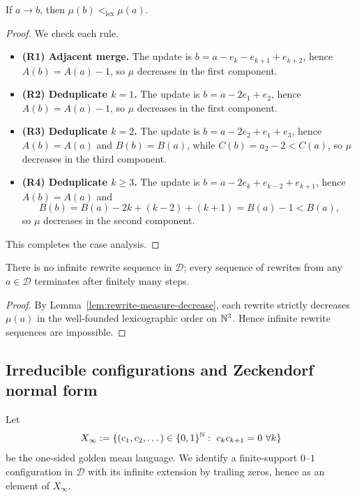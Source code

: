 \begin{lemma}\label{lem:rewrite-measure-decrease}
If $a\to b$, then $\mu(b)<_{\mathrm{lex}}\mu(a)$.
\end{lemma}
\begin{proof}
We check each rule.
\begin{itemize}
  \item \textbf{(R1) Adjacent merge.}
  The update is $b=a-e_k-e_{k+1}+e_{k+2}$, hence $A(b)=A(a)-1$, so $\mu$ decreases in the first component.
  \item \textbf{(R2) Deduplicate $k=1$.}
  The update is $b=a-2e_1+e_2$, hence $A(b)=A(a)-1$, so $\mu$ decreases in the first component.
  \item \textbf{(R3) Deduplicate $k=2$.}
  The update is $b=a-2e_2+e_1+e_3$, hence $A(b)=A(a)$ and $B(b)=B(a)$, while $C(b)=a_2-2<C(a)$, so $\mu$ decreases in the third component.
  \item \textbf{(R4) Deduplicate $k\ge 3$.}
  The update is $b=a-2e_k+e_{k-2}+e_{k+1}$, hence $A(b)=A(a)$ and
  \[
  B(b)=B(a)-2k+(k-2)+(k+1)=B(a)-1<B(a),
  \]
  so $\mu$ decreases in the second component.
\end{itemize}
This completes the case analysis.
\end{proof}

\begin{proposition}\label{prop:rewrite-termination}
There is no infinite rewrite sequence in $\mathcal{D}$; every sequence of rewrites from any $a\in\mathcal{D}$ terminates after finitely many steps.
\end{proposition}
\begin{proof}
By Lemma~\ref{lem:rewrite-measure-decrease}, each rewrite strictly decreases $\mu(a)$ in the well-founded lexicographic order on $\mathbb{N}^3$.
Hence infinite rewrite sequences are impossible.
\end{proof}

\subsection{Irreducible configurations and Zeckendorf normal form}\label{app:rewrite-irreducible}
Let
\[
X_\infty:=\{(c_1,c_2,\dots)\in\{0,1\}^{\NN}:\ c_kc_{k+1}=0\ \forall k\}
\]
be the one-sided golden mean language.
We identify a finite-support $0$--$1$ configuration in $\mathcal{D}$ with its infinite extension by trailing zeros, hence as an element of $X_\infty$.

